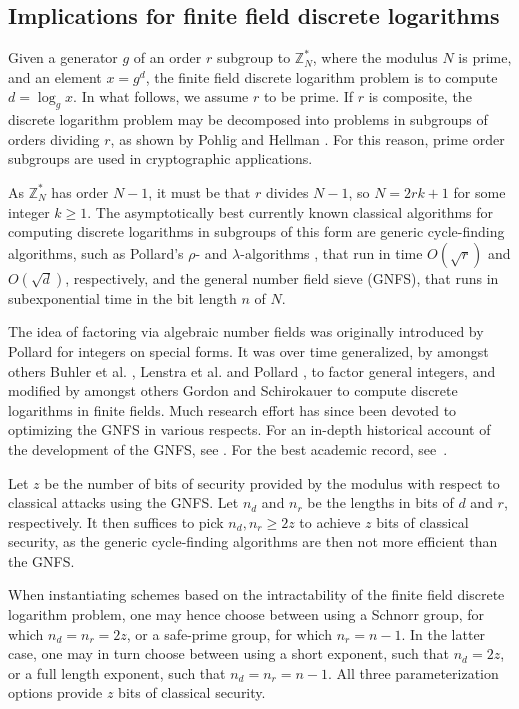 \documentclass[a4paper, onecolumn, accepted=2021-03-29]{quantumarticle}
\newcommand{\gen}{g}
\begin{document}
\subsection{Implications for finite field discrete logarithms}
Given a generator $\gen$ of an order $r$ subgroup to $\mathbb Z^*_N$, where the modulus $N$ is prime, and an element $x = \gen^d$, the finite field discrete logarithm problem is to compute $d = \log_{\gen} x$. In what follows, we assume $r$ to be prime. If $r$ is composite, the discrete logarithm problem may be decomposed into problems in subgroups of orders dividing $r$, as shown by Pohlig and Hellman \cite{pohlig-hellman}. For this reason, prime order subgroups are used in cryptographic applications.

As $\mathbb Z_N^*$ has order $N-1$, it must be that $r$ divides $N-1$, so $N = 2rk+1$ for some integer $k \ge 1$. The asymptotically best currently known classical algorithms for computing discrete logarithms in subgroups of this form are generic cycle-finding algorithms, such as Pollard's $\rho$- and $\lambda$-algorithms \cite{pollard-rho-lambda}, that run in time $O(\sqrt{r})$ and $O(\sqrt{d})$, respectively, and the general number field sieve (GNFS), that runs in subexponential time in the bit length $n$ of $N$.

The  idea of factoring via algebraic number fields was originally introduced by Pollard \cite{pollard-cubic} for integers on special forms. It was over time generalized, by amongst others Buhler et al. \cite{buhler-nfs}, Lenstra et al. \cite{lenstra-nfs} and Pollard \cite{pollard-nfs-sieving}, to factor general integers, and modified by amongst others Gordon \cite{gordon} and Schirokauer \cite{schirokauer-thesis, schirokauer} to compute discrete logarithms in finite fields. Much research effort has since been devoted to optimizing the GNFS in various respects. For an in-depth historical account of the development of the GNFS, see \cite{nfs-book, pomerance1996atale}. For the best academic record, see~\cite{boudot-rsa829}.

Let $z$ be the number of bits of security provided by the modulus with respect to classical attacks using the GNFS. Let $n_d$ and $n_r$ be the lengths in bits of $d$ and $r$, respectively. It then suffices to pick $n_d, n_r \ge 2z$ to achieve $z$ bits of classical security, as the generic cycle-finding algorithms are then not more efficient than the GNFS.

When instantiating schemes based on the intractability of the finite field discrete logarithm problem, one may hence choose between using a Schnorr group, for which $n_d = n_r = 2z$, or a safe-prime group, for which $n_r = n - 1$. In the latter case, one may in turn choose between using a short exponent, such that $n_d = 2z$, or a full length exponent, such that $n_d = n_r = n - 1$. All three parameterization options provide $z$ bits of classical security.
\end{document}
